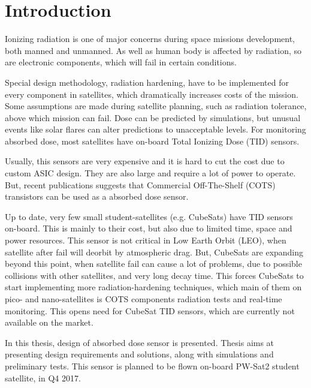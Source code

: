 \chapter{Introduction}
    Ionizing radiation is one of major concerns during space missions development, both manned and unmanned. As well as human body is affected by radiation, so are electronic components, which will fail in certain conditions.

    Special design methodology, radiation hardening, have to be implemented for every component in satellites, which dramatically increases costs of the mission. Some assumptions are made during satellite planning, such as radiation tolerance, above which mission can fail. Dose can be predicted by simulations, but unusual events like solar flares can alter predictions to unacceptable levels. For monitoring absorbed dose, most satellites have on-board Total Ionizing Dose (TID) sensors.

    Usually, this sensors are very expensive and it is hard to cut the cost due to custom ASIC design. They are also large and require a lot of power to operate. But, recent publications suggests that Commercial Off-The-Shelf (COTS) transistors can be used as a absorbed dose sensor.

    Up to date, very few small student-satellites (e.g. CubeSats) have TID sensors on-board. This is mainly to their cost, but also due to limited time, space and power resources. This sensor is not critical in Low Earth Orbit (LEO), when satellite after fail will deorbit by atmospheric drag. But, CubeSats are expanding beyond this point, when satellite fail can cause a lot of problems, due to possible collisions with other satellites, and very long decay time. This forces CubeSats to start implementing more radiation-hardening techniques, which main of them on pico- and nano-satellites is COTS components radiation tests and real-time monitoring. This opens need for CubeSat TID sensors, which are currently not available on the market.

    In this thesis, design of absorbed dose sensor is presented. Thesis aims at presenting design requirements and solutions, along with simulations and preliminary tests. This sensor is planned to be flown on-board PW-Sat2 student satellite, in Q4 2017.


